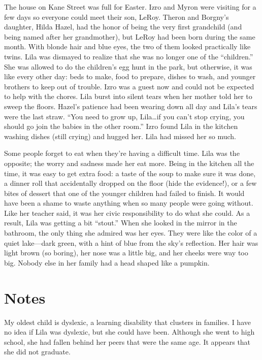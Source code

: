 \documentclass[
  american,
  letterpaper,
]{book}
\begin{document}
The house on Kane Street was full for Easter. Izro and Myron were
visiting for a few days so everyone could meet their son, LeRoy. Theron
and Borgny's daughter, Hilda Hazel, had the honor of being the very
first grandchild (and being named after her grandmother), but LeRoy had
been born during the same month. With blonde hair and blue eyes, the two
of them looked practically like twins. Lila was dismayed to realize that
she was no longer one of the ``children.'' She was allowed to do the
children's egg hunt in the park, but otherwise, it was like every other
day: beds to make, food to prepare, dishes to wash, and younger brothers
to keep out of trouble. Izro was a guest now and could not be expected
to help with the chores. Lila burst into silent tears when her mother
told her to sweep the floors. Hazel's patience had been wearing down all
day and Lila's tears were the last straw. ``You need to grow up,
Lila\ldots if you can't stop crying, you should go join the babies in
the other room.'' Izro found Lila in the kitchen washing dishes (still
crying) and hugged her. Lila had missed her so much.

Some people forget to eat when they're having a difficult time. Lila was
the opposite; the worry and sadness made her eat more. Being in the
kitchen all the time, it was easy to get extra food: a taste of the soup
to make sure it was done, a dinner roll that accidentally dropped on the
floor (hide the evidence!), or a few bites of dessert that one of the
younger children had failed to finish. It would have been a shame to
waste anything when so many people were going without. Like her teacher
said, it was her civic responsibility to do what she could. As a result,
Lila was getting a bit ``stout.'' When she looked in the mirror in the
bathroom, the only thing she admired was her eyes. They were like the
color of a quiet lake---dark green, with a hint of blue from the sky's
reflection. Her hair was light brown (so boring), her nose was a little
big, and her cheeks were way too big. Nobody else in her family had a
head shaped like a pumpkin.

\section{Notes}\label{notes-11}

My oldest child is dyslexic, a learning disability that clusters in
families. I have no idea if Lila was dyslexic, but she could have been.
Although she went to high school, she had fallen behind her peers that
were the same age. It appears that she did not graduate.
\end{document}
